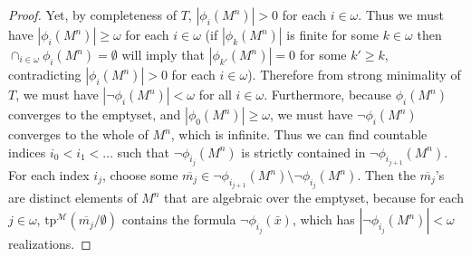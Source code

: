 \documentclass{article}
\begin{document}
\begin{enumerate}[label={\bf Q\arabic*:}]
\begin{proof}
      Yet, by completeness of $T$, $|\phi_i(M^n)|>0$ for each $i\in\omega$.
      Thus we must have $|\phi_i(M^n)|\geq\omega$ for each $i\in\omega$ (if
      $|\phi_k(M^n)|$ is finite for some $k\in\omega$ then
      $\cap_{i\in\omega} \phi_i(M^n) =\emptyset$ will imply that
      $|\phi_{k'}(M^n)|=0$ for some $k'\geq k$, contradicting
      $|\phi_i(M^n)|>0$ for each $i\in\omega$). Therefore from strong
      minimality of $T$, we must have $|\neg\phi_i(M^n)|<\omega$ for all
      $i\in\omega$. Furthermore, because $\phi_i(M^n)$ converges to the
      emptyset, and $|\phi_0(M^n)|\geq\omega$, we must have
      $\neg\phi_i(M^n)$ converges to the whole of $M^n$, which is infinite.
      Thus we can find countable indices $i_0<i_1<\ldots$ such that
      $\neg\phi_{i_j}(M^n)$ is strictly contained in
      $\neg\phi_{i_{j+1}}(M^n)$. For each index $i_j$, choose some
      $\overline{m_j}\in \neg\phi_{i_{j+1}}(M^n)\setminus
      \neg\phi_{i_{j}}(M^n)$. Then the $\overline{m_j}$'s are distinct
      elements of $M^n$ that are algebraic over the emptyset, because for
      each $j\in\omega$, $\text{tp}^\mathcal{M}(\overline{m_j}/\emptyset)$
      contains the formula $\neg\phi_{i_j}(\bar{x})$, which has
      $|\neg\phi_{i_j}(M^n)|<\omega$ realizations.
    \end{proof}
\end{enumerate}
\end{document}
